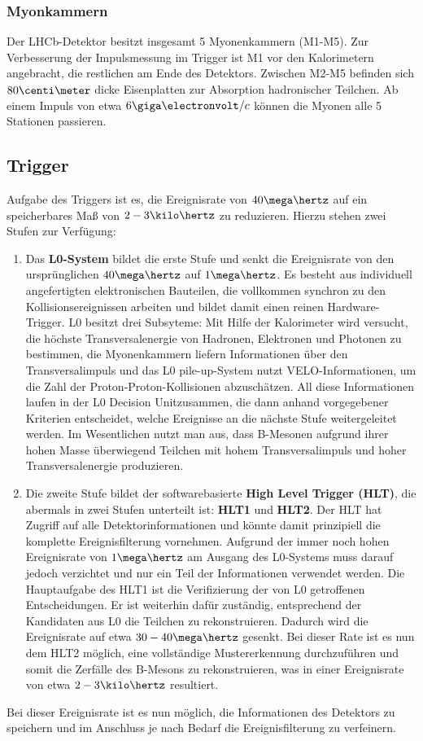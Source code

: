 \subsubsection{Myonkammern}
Der LHCb-Detektor besitzt insgesamt 5 Myonenkammern (M1-M5). Zur Verbesserung der Impulsmessung im Trigger ist M1 vor den Kalorimetern angebracht, die restlichen am Ende des Detektors. Zwischen M2-M5 befinden sich $80\centi\meter$ dicke Eisenplatten zur Absorption hadronischer Teilchen. Ab einem Impuls von etwa $6\giga\electronvolt/c$ können die Myonen alle 5 Stationen passieren. \cite{thesis_linn}

\subsection{Trigger}
Aufgabe des Triggers ist es, die Ereignisrate von $40\mega\hertz$ auf ein speicherbares Maß von $2-3\kilo\hertz$ zu reduzieren. Hierzu stehen zwei Stufen zur Verfügung:
\begin{enumerate}
    \item Das \textbf{L0-System} bildet die erste Stufe und senkt die Ereignisrate von den ursprünglichen $40\mega\hertz$ auf $1\mega\hertz$. Es besteht aus individuell angefertigten elektronischen Bauteilen, die vollkommen synchron zu den Kollisionsereignissen arbeiten und bildet damit einen reinen Hardware-Trigger. L0 besitzt drei Subsyteme: Mit Hilfe der Kalorimeter wird versucht, die höchste Transversalenergie von Hadronen, Elektronen und Photonen zu bestimmen, die Myonenkammern liefern Informationen über den Transversalimpuls und das \glqq L0 pile-up\grqq-System nutzt VELO-Informationen, um die Zahl der Proton-Proton-Kollisionen abzuschätzen. All diese Informationen laufen in der \glqq L0 Decision Unit\grqq zusammen, die dann anhand vorgegebener Kriterien entscheidet, welche Ereignisse an die nächste Stufe weitergeleitet werden. Im Wesentlichen nutzt man aus, dass B-Mesonen aufgrund ihrer hohen Masse überwiegend Teilchen mit hohem Transversalimpuls und hoher Transversalenergie produzieren.
    \item Die zweite Stufe bildet der softwarebasierte \textbf{High Level Trigger (HLT)}, die abermals in zwei Stufen unterteilt ist: \textbf{HLT1} und \textbf{HLT2}. Der HLT hat Zugriff auf alle Detektorinformationen und könnte damit prinzipiell die komplette Ereignisfilterung vornehmen. Aufgrund der immer noch hohen Ereignisrate von $1\mega\hertz$ am Ausgang des L0-Systems muss darauf jedoch verzichtet und nur ein Teil der Informationen verwendet werden. Die Hauptaufgabe des HLT1 ist die Verifizierung der von L0 getroffenen Entscheidungen. Er ist weiterhin dafür zuständig, entsprechend der Kandidaten aus L0 die Teilchen zu rekonstruieren. Dadurch wird die Ereignisrate auf etwa $30-40\mega\hertz$ gesenkt. Bei dieser Rate ist es nun dem HLT2 möglich, eine vollständige Mustererkennung durchzuführen und somit die Zerfälle des B-Mesons zu rekonstruieren, was in einer Ereignisrate von etwa $2-3\kilo\hertz$ resultiert. 
\end{enumerate}
Bei dieser Ereignisrate ist es nun möglich, die Informationen des Detektors zu speichern und im Anschluss je nach Bedarf die Ereignisfilterung zu verfeinern. \cite{detector}